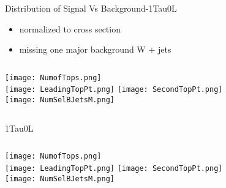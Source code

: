 \documentclass{beamer}
\begin{document}
\begin{frame}{Distribution of Signal Vs Background-1Tau0L}
    \begin{itemize}
    \item
      normalized to cross section
    \item
        missing one major background W + jets
    \end{itemize}
    \begin{columns}[t]
    \centering
    \texttt{[image: NumofTops.png]}\\
    \texttt{[image: LeadingTopPt.png]}
    \centering
    \texttt{[image: SecondTopPt.png]}\\
    \texttt{[image: NumSelBJetsM.png]}
    \end{columns}
\end{frame}


\begin{frame}{1Tau0L}
    \begin{columns}[t]
    \centering
    \texttt{[image: NumofTops.png]}\\
    \texttt{[image: LeadingTopPt.png]}
    \centering
    \texttt{[image: SecondTopPt.png]}\\
    \texttt{[image: NumSelBJetsM.png]}
    \end{columns}
\end{frame}
\end{document}
